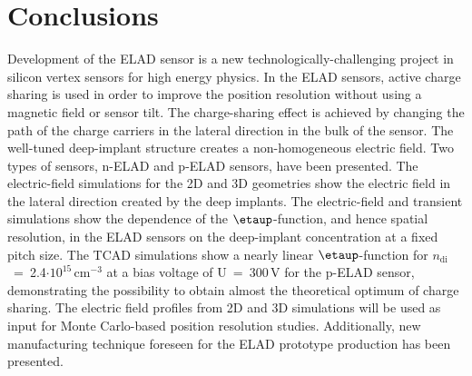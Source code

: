 \documentclass[a4paper,11pt]{article}
\begin{document}
\section{Conclusions}
Development of the ELAD sensor is a new technologically-challenging project in silicon vertex sensors for high energy physics. 
In the ELAD sensors, active charge sharing is used in order to improve the position resolution without using a magnetic field or sensor tilt.
The charge-sharing effect is achieved by changing the path of the charge carriers in the lateral direction in the bulk of the sensor.
The well-tuned deep-implant structure creates a non-homogeneous electric field.
Two types of sensors, n-ELAD and p-ELAD sensors, have been presented.
The electric-field simulations for the 2D and 3D geometries show the electric field in the lateral direction created by the deep implants.
The electric-field and transient simulations show the dependence of the $\etaup$-function, and hence spatial resolution, in the ELAD sensors on the deep-implant concentration at a fixed pitch size.
The TCAD simulations show a nearly linear $\etaup$-function for $n\mathrm{_{di}}$~=~2.4$\mathrm{\cdot10^{15}\,cm^{-3}}$ at a bias voltage of U~=~300\,V for the p-ELAD sensor,
 demonstrating the possibility to obtain almost the theoretical optimum of charge sharing.
The electric field profiles from 2D and 3D simulations will be used as input for Monte Carlo-based position resolution studies.
Additionally, new manufacturing technique foreseen for the ELAD prototype production has been presented. 

{\small


}







\end{document}
